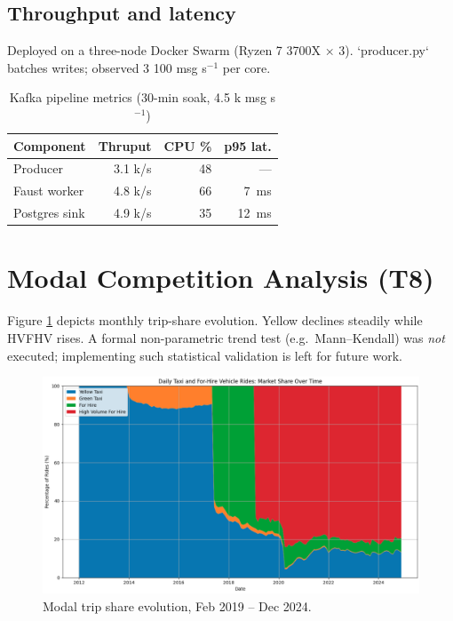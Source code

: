 \documentclass[conference]{IEEEtran}
\begin{document}
\subsection{Throughput and latency}
Deployed on a three-node Docker Swarm (Ryzen 7 3700X × 3).
`producer.py` batches writes; observed 3 100 msg s\(^{-1}\) per core.

\begin{table}[htbp]
  \caption{Kafka pipeline metrics (30-min soak, 4.5 k msg s\(^{-1}\))}
  \label{tab:kafka-metrics}
  \centering
  \begin{tabular}{lrrr}
    \toprule
    Component & Thruput & CPU \% & p95 lat. \\ \midrule
    Producer        & 3.1 k/s & 48 & — \\
    Faust worker    & 4.8 k/s & 66 & \SI{7}{ms} \\
    Postgres sink   & 4.9 k/s & 35 & \SI{12}{ms} \\
    \bottomrule
  \end{tabular}
\end{table}


\section{Modal Competition Analysis (T8)}\label{sec:impact}
Figure \ref{fig:mode-evolution} depicts monthly trip-share evolution.
Yellow declines steadily while HVFHV rises.
A formal non-parametric trend test (e.g.\ Mann–Kendall) was \emph{not}
executed; implementing such statistical validation is left for future
work.

\begin{figure}[htbp]
  \centering
  \includegraphics[width=0.88\linewidth]{figures/mode_evolution.png}
  \caption{Modal trip share evolution, Feb 2019 – Dec 2024.}
  \label{fig:mode-evolution}
\end{figure}
\end{document}

